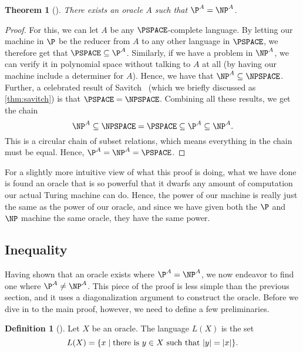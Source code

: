 \documentclass[english,12pt]{reedthesis}
\theoremstyle{plain}
\newtheorem{thm}{Theorem}[section]
\theoremstyle{definition}
\newtheorem{defn}[defn]{Definition}
\theoremstyle{remark}
\DeclarePairedDelimiter{\abs}{\lvert}{\rvert}
\begin{document}
\begin{thm}[{\cite[Theorem 2]{BGS75}}]\label{thm:p-np-rel}
  There exists an oracle $A$ such that $\P^{A} = \NP^{A}$.
\end{thm}

\begin{proof}
  For this, we can let $A$ be any $\PSPACE$-complete language. By letting our
  machine in $\P$ be the reducer from $A$ to any other language in $\PSPACE$, we
  therefore get that $\PSPACE \subseteq \P^{A}$. Similarly, if we have a problem in
  $\NP^{A}$, we can verify it in polynomial space without talking to $A$ at all
  (by having our machine include a determiner for $A$). Hence, we have that
  $\NP^{A} \subseteq \NPSPACE$. Further, a celebrated result of Savitch~\cite{Sav70}
  (which we briefly discussed as \cref{thm:savitch}) is that
  $\PSPACE = \NPSPACE$. Combining all these results, we get the chain
  \begin{equation}
    \NP^{A} \subseteq \NPSPACE = \PSPACE \subseteq \P^{A} \subseteq \NP^{A}.
  \end{equation}
  This is a circular chain of subset relations, which means everything in the
  chain must be equal. Hence, $\P^{A} = \NP^{A} = \PSPACE$.
\end{proof}

For a slightly more intuitive view of what this proof is doing, what we have
done is found an oracle that is so powerful that it dwarfs any amount of
computation our actual Turing machine can do. Hence, the power of our machine is
really just the same as the power of our oracle, and since we have given both
the $\P$ and $\NP$ machine the same oracle, they have the same power.

\subsection{Inequality}

Having shown that an oracle exists where $\P^{A} = \NP^{A}$, we now endeavor to
find one where $\P^{A} \ne \NP^{A}$. This piece of the proof is less simple than
the previous section, and it uses a diagonalization argument to construct the
oracle. Before we dive in to the main proof, however, we need to define a few
preliminaries.

\begin{defn}[{\cite[436]{BGS75}}]\label{def:l(x)}
  Let $X$ be an oracle. The language $L(X)$ is the set
  \begin{equation*}
    L(X) = \{x \mid \text{there is } y \in X \text{ such that } \abs{y} = \abs{x}\}.
  \end{equation*}
\end{defn}
\end{document}
